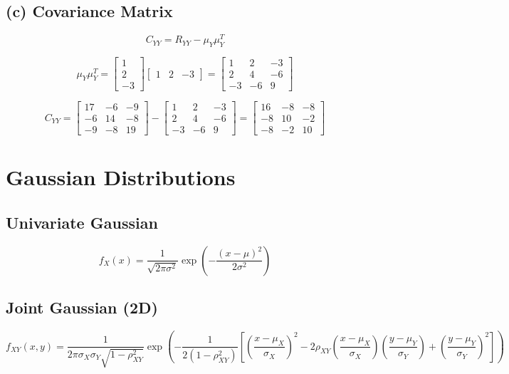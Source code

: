 \documentclass[11pt]{article}
\begin{document}
\subsection{(c) Covariance Matrix}

\[
C_{YY} = R_{YY} - \mu_Y \mu_Y^T
\]

\[
\mu_Y \mu_Y^T =
\begin{bmatrix}
1 \\ 2 \\ -3
\end{bmatrix}
\begin{bmatrix}
1 & 2 & -3
\end{bmatrix}
=
\begin{bmatrix}
1 & 2 & -3 \\
2 & 4 & -6 \\
-3 & -6 & 9
\end{bmatrix}
\]

\[
C_{YY} =
\begin{bmatrix}
17 & -6 & -9 \\
-6 & 14 & -8 \\
-9 & -8 & 19
\end{bmatrix}
-
\begin{bmatrix}
1 & 2 & -3 \\
2 & 4 & -6 \\
-3 & -6 & 9
\end{bmatrix}
=
\begin{bmatrix}
16 & -8 & -8 \\
-8 & 10 & -2 \\
-8 & -2 & 10
\end{bmatrix}
\]

\section{Gaussian Distributions}

\subsection{Univariate Gaussian}
\[
f_X(x) = \frac{1}{\sqrt{2\pi\sigma^2}} \exp\left(-\frac{(x-\mu)^2}{2\sigma^2}\right)
\]

\subsection{Joint Gaussian (2D)}
\[
f_{XY}(x,y) =
\frac{1}{2\pi \sigma_X \sigma_Y \sqrt{1-\rho_{XY}^2}}
\exp\left(
-\frac{1}{2(1-\rho_{XY}^2)}
\left[
\left(\frac{x-\mu_X}{\sigma_X}\right)^2
-2\rho_{XY}\left(\frac{x-\mu_X}{\sigma_X}\right)\left(\frac{y-\mu_Y}{\sigma_Y}\right)
+\left(\frac{y-\mu_Y}{\sigma_Y}\right)^2
\right]
\right)
\]
\end{document}
